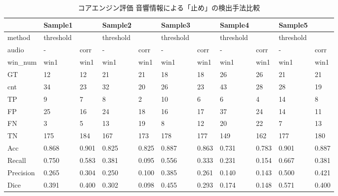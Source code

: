 \documentclass[paper]{ieicej}
\begin{document}
\begin{table}[t]
  \centering
  \caption{コアエンジン評価 音響情報による「止め」の検出手法比較}
  \begin{tabularx}{\textwidth}{l *{10}{X}} %
    \toprule
              & Sample1   &       & Sample2   &       & Sample3   &       & Sample4   &       & Sample5   &       \\
    \midrule
    method    & threshold &       & threshold &       & threshold &       &
    threshold &       & threshold &       \\
    \midrule
    audio     & -         & corr  & -         & corr  & -         & corr  & -         & corr  & -         & corr  \\
    \midrule
    win\_num  & win1      & win1  & win1      & win1  & win1      & win1  & win1      & win1  & win1      & win1  \\
    \midrule
    GT        & 12        & 12    & 21        & 21    & 18        & 18    & 26        & 26    & 21        & 21    \\
    cnt       & 34        & 23    & 32        & 20    & 26        & 23    & 43        & 28    & 28        & 19    \\
    TP        & 9         & 7     & 8         & 2     & 10        & 6     & 6         & 4     & 14        & 8     \\
    FP        & 25        & 16    & 24        & 18    & 16        & 17    & 37        & 24    & 14        & 11    \\
    FN        & 3         & 5     & 13        & 19    & 8         & 12    & 20        & 22    & 7         & 13    \\
    TN        & 175       & 184   & 167       & 173   & 178       & 177   & 149       & 162   & 177       & 180   \\
    Acc       & 0.868     & 0.901 & 0.825     & 0.825 & 0.887     & 0.863 & 0.731     & 0.783 & 0.901     & 0.887 \\
    Recall    & 0.750     & 0.583 & 0.381     & 0.095 & 0.556     & 0.333 & 0.231     & 0.154 & 0.667     & 0.381 \\
    Precision & 0.265     & 0.304 & 0.250     & 0.100 & 0.385     & 0.261 & 0.140     & 0.143 & 0.500     & 0.421 \\
    Dice      & 0.391     & 0.400 & 0.302     & 0.098 & 0.455     & 0.293 & 0.174     & 0.148 & 0.571     & 0.400 \\
    \bottomrule
  \end{tabularx}
\end{table}
\end{document}
